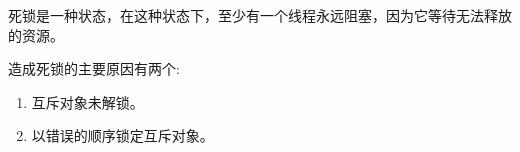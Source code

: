 死锁是一种状态，在这种状态下，至少有一个线程永远阻塞，因为它等待无法释放的资源。

造成死锁的主要原因有两个:

\begin{enumerate}
\item 
互斥对象未解锁。

\item 
以错误的顺序锁定互斥对象。
\end{enumerate}

